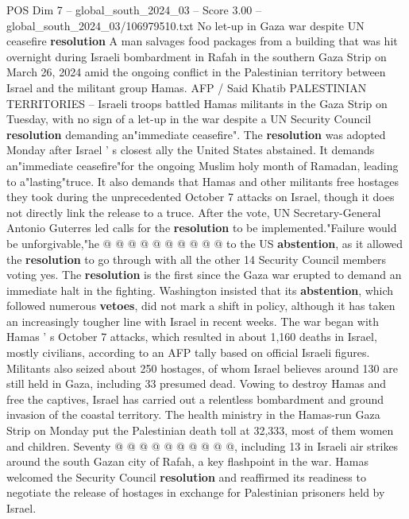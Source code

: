 \begin{textsample}{POS Dim 7 – global\_south\_2024\_03 – Score 3.00 – global\_south\_2024\_03/106979510.txt}  \label{ex:f7_pos_027}
No let-up in Gaza war despite UN ceasefire \textbf{resolution} A man salvages food packages from a building that was hit overnight during Israeli bombardment in Rafah in the southern Gaza Strip on March 26, 2024 amid the ongoing conflict in the Palestinian territory between Israel and the militant group Hamas.
AFP / Said Khatib PALESTINIAN TERRITORIES -- Israeli troops battled Hamas militants in the Gaza Strip on Tuesday, with no sign of a let-up in the war despite a UN Security Council \textbf{resolution} demanding an"immediate ceasefire".
The \textbf{resolution} was adopted Monday after Israel ' s closest ally the United States abstained.
It demands an"immediate ceasefire"for the ongoing Muslim holy month of Ramadan, leading to a"lasting"truce.
It also demands that Hamas and other militants free hostages they took during the unprecedented October 7 attacks on Israel, though it does not directly link the release to a truce.
After the vote, UN Secretary-General Antonio Guterres led calls for the \textbf{resolution} to be implemented."Failure would be unforgivable,"he @ @ @ @ @ @ @ @ @ @ to the US \textbf{abstention}, as it allowed the \textbf{resolution} to go through with all the other 14 Security Council members voting yes.
The \textbf{resolution} is the first since the Gaza war erupted to demand an immediate halt in the fighting.
Washington insisted that its \textbf{abstention}, which followed numerous \textbf{vetoes}, did not mark a shift in policy, although it has taken an increasingly tougher line with Israel in recent weeks.
The war began with Hamas ' s October 7 attacks, which resulted in about 1,160 deaths in Israel, mostly civilians, according to an AFP tally based on official Israeli figures.
Militants also seized about 250 hostages, of whom Israel believes around 130 are still held in Gaza, including 33 presumed dead.
Vowing to destroy Hamas and free the captives, Israel has carried out a relentless bombardment and ground invasion of the coastal territory.
The health ministry in the Hamas-run Gaza Strip on Monday put the Palestinian death toll at 32,333, most of them women and children.
Seventy @ @ @ @ @ @ @ @ @ @, including 13 in Israeli air strikes around the south Gazan city of Rafah, a key flashpoint in the war.
Hamas welcomed the Security Council \textbf{resolution} and reaffirmed its readiness to negotiate the release of hostages in exchange for Palestinian prisoners held by Israel.

\end{textsample}
